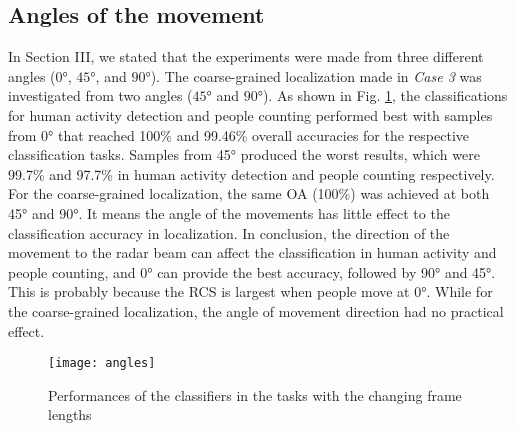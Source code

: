 \subsection{Angles of the movement}
In Section III, we stated that the experiments were made from three different angles ($\ang{0}$, $\ang{45}$, and $\ang{90}$). The coarse-grained localization made in \textit{Case 3} was investigated from two angles ($\ang{45}$ and $\ang{90}$). As shown in Fig. \ref{fig_angles}, the classifications for human activity detection and people counting performed best with samples from $\ang{0}$ that reached 100\% and 99.46\% overall accuracies for the respective classification tasks. Samples from \ang{45} produced the worst results, which were 99.7\% and 97.7\% in human activity detection and people counting respectively. For the coarse-grained localization, the same OA (100\%) was achieved at both \ang{45} and \ang{90}. It means the angle of the movements has little effect to the classification accuracy in localization. In conclusion, the direction of the movement to the radar beam can affect the classification in human activity and people counting, and \ang{0} can provide the best accuracy, followed by \ang{90} and \ang{45}. This is probably because the RCS is largest when people move at \ang{0}.  While for the coarse-grained localization, the angle of movement direction had no practical effect.
\begin{figure}[!ht]
         \centering
         \texttt{[image: angles]}
         \caption{Performances of the classifiers in the tasks with the changing frame lengths}
         \label{fig_angles}
\end{figure}
